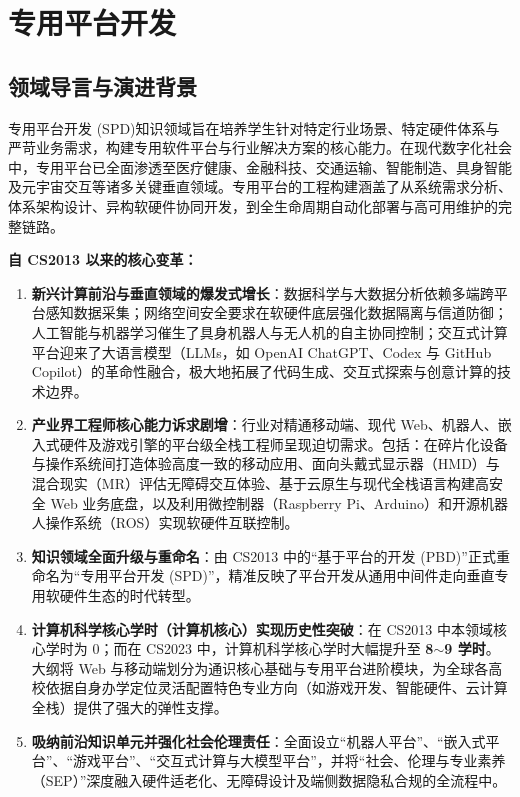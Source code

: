 \chapter{专用平台开发}

\section{领域导言与演进背景}

\begin{preamblebox}[知识领域概述与变革]
专用平台开发 (SPD)知识领域旨在培养学生针对特定行业场景、特定硬件体系与严苛业务需求，构建专用软件平台与行业解决方案的核心能力。在现代数字化社会中，专用平台已全面渗透至医疗健康、金融科技、交通运输、智能制造、具身智能及元宇宙交互等诸多关键垂直领域。专用平台的工程构建涵盖了从系统需求分析、体系架构设计、异构软硬件协同开发，到全生命周期自动化部署与高可用维护的完整链路。

\textbf{自 CS2013 以来的核心变革：}
\begin{enumerate}
    \item \textbf{新兴计算前沿与垂直领域的爆发式增长}：数据科学与大数据分析依赖多端跨平台感知数据采集；网络空间安全要求在软硬件底层强化数据隔离与信道防御；人工智能与机器学习催生了具身机器人与无人机的自主协同控制；交互式计算平台迎来了大语言模型（LLMs，如 OpenAI ChatGPT、Codex 与 GitHub Copilot）的革命性融合，极大地拓展了代码生成、交互式探索与创意计算的技术边界。
    \item \textbf{产业界工程师核心能力诉求剧增}：行业对精通移动端、现代 Web、机器人、嵌入式硬件及游戏引擎的平台级全栈工程师呈现迫切需求。包括：在碎片化设备与操作系统间打造体验高度一致的移动应用、面向头戴式显示器（HMD）与混合现实（MR）评估无障碍交互体验、基于云原生与现代全栈语言构建高安全 Web 业务底盘，以及利用微控制器（Raspberry Pi、Arduino）和开源机器人操作系统（ROS）实现软硬件互联控制。
    \item \textbf{知识领域全面升级与重命名}：由 CS2013 中的“基于平台的开发 (PBD)”正式重命名为“专用平台开发 (SPD)”，精准反映了平台开发从通用中间件走向垂直专用软硬件生态的时代转型。
    \item \textbf{计算机科学核心学时（计算机核心）实现历史性突破}：在 CS2013 中本领域核心学时为 0；而在 CS2023 中，计算机科学核心学时大幅提升至 \textbf{8$\sim$9 学时}。大纲将 Web 与移动端划分为通识核心基础与专用平台进阶模块，为全球各高校依据自身办学定位灵活配置特色专业方向（如游戏开发、智能硬件、云计算全栈）提供了强大的弹性支撑。
    \item \textbf{吸纳前沿知识单元并强化社会伦理责任}：全面设立“机器人平台”、“嵌入式平台”、“游戏平台”、“交互式计算与大模型平台”，并将“社会、伦理与专业素养（SEP）”深度融入硬件适老化、无障碍设计及端侧数据隐私合规的全流程中。
\end{enumerate}
\end{preamblebox}

